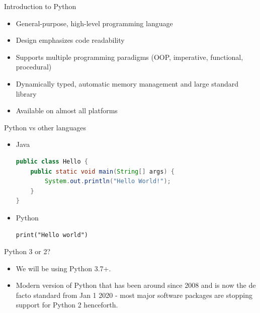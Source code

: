 \documentclass[aspectratio=169]{beamer}
\begin{document}
\begin{frame}{Introduction to Python}
    \begin{itemize}
        \item General-purpose, high-level programming language
        \item Design emphasizes code readability
        \item Supports multiple programming paradigms (OOP, imperative, functional, procedural)
        \item Dynamically typed, automatic memory management and large standard library
        \item Available on almost all platforms
    \end{itemize}
    
\end{frame}


\begin{frame}[fragile]{Python vs other languages}
\begin{itemize}
    \item Java
    \begin{lstlisting}[language=Java]
public class Hello {
    public static void main(String[] args) {
        System.out.println("Hello World!");
    }
}
    \end{lstlisting}
    \item Python
    \begin{lstlisting}
print("Hello world")
    \end{lstlisting}
\end{itemize}
\end{frame}

\begin{frame}{Python 3 or 2?}
    \begin{itemize}
        \item We will be using Python 3.7+.
        \item Modern version of Python that has been around since 2008 and is now the de facto standard from Jan 1 2020 - most major software packages are stopping support for Python 2 henceforth.
    \end{itemize}
\end{frame} 
\end{document}
